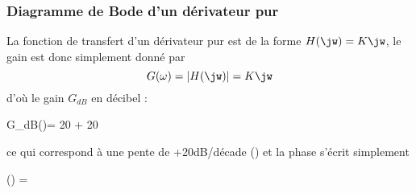 \subsubsection{Diagramme de Bode d'un dérivateur pur}


La fonction de transfert d'un dérivateur pur est de la forme $H(\jw)=K\jw$,
le gain est donc simplement donné par 
$$
G(\omega)=|H(\jw)|=K\jw
$$ 
d'où le gain $G_{dB}$ en décibel :
\begin{bequation}
G_{dB}(\omega)= 20 + 20\log{\omega}
\end{bequation}
ce qui correspond à une pente de +20dB/décade () et
la phase s'écrit simplement 
\begin{bequation}
\phi(\omega) = 
\end{bequation}

